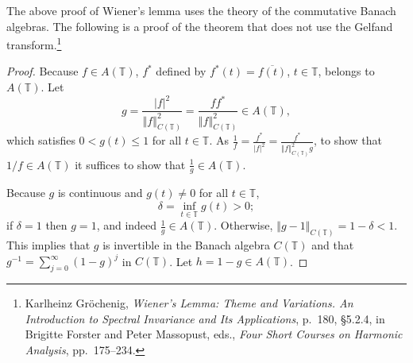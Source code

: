 \documentclass{article}
\newcommand{\norm}[1]{\left\Vert #1 \right\Vert}
\theoremstyle{definition}
\begin{document}
The above proof of Wiener's lemma uses the theory of the commutative Banach algebras.
The following is a proof of the theorem that does not use the Gelfand transform.\footnote{Karlheinz Gr\"ochenig,
{\em Wiener's Lemma: Theme and Variations. An Introduction to
Spectral Invariance and Its Applications}, p.~180, \S 5.2.4, in Brigitte Forster and Peter Massopust, eds., {\em Four Short Courses on Harmonic Analysis}, pp.~175--234.}

\begin{proof}
Because $f \in A(\mathbb{T})$, $f^*$ defined by $f^*(t)=\overline{f(t)}$, $t \in \mathbb{T}$, belongs to $A(\mathbb{T})$.
Let
\[
g=\frac{|f|^2}{\norm{f}_{C(\mathbb{T})}^2}=\frac{ff^*}{\norm{f}_{C(\mathbb{T})}^2} \in A(\mathbb{T}),
\]
which satisfies $0 < g(t) \leq 1$ for all $t \in \mathbb{T}$.
As $\frac{1}{f}=\frac{f^*}{|f|^2}=\frac{f^*}{\norm{f}_{C(\mathbb{T})}^2 g}$, to show that $1/f \in A(\mathbb{T})$ it suffices to show that $\frac{1}{g} \in A(\mathbb{T})$. 

Because $g$ is continuous and $g(t) \neq 0$ for all $t \in \mathbb{T}$,
\[
\delta=\inf_{t \in \mathbb{T}} g(t)>0;
\]
if $\delta=1$ then $g=1$, and indeed $\frac{1}{g} \in A(\mathbb{T})$. Otherwise,
$\norm{g-1}_{C(\mathbb{T})} = 1-\delta<1$.  This implies that $g$ is invertible in the Banach algebra
$C(\mathbb{T})$ and that $g^{-1}=\sum_{j=0}^\infty (1-g)^j$ in $C(\mathbb{T})$. Let
$h=1-g \in A(\mathbb{T})$. 


\end{proof}
\end{document}
